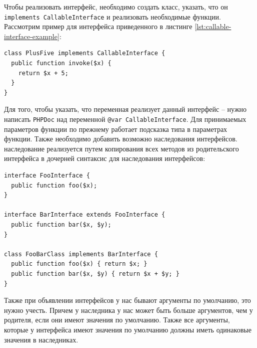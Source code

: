 Чтобы реализовать интерфейс, необходимо создать класс, указать, что он \verb|implements CallableInterface| и реализовать необходимые функции.
Рассмотрим пример для интерфейса приведенного в листинге \ref{lst:callable-interface-example}:
\begin{lstlisting}
class PlusFive implements CallableInterface {
  public function invoke($x) {
    return $x + 5;
  } 
}
\end{lstlisting}

Для того, чтобы указать, что переменная реализует данный интерфейс -- нужно написать \verb|PHPDoc| \cite{phpdoc} над переменной \verb|@var CallableInterface|.
Для принимаемых параметров функции по прежнему работает подсказка типа в параметрах функции.
Также необходимо добавить возможно наследования интерфейсов.
наследование реализуется путем копирования всех методов из родительского интерфейса в дочерней синтаксис для наследования интерфейсов:
\begin{lstlisting}
interface FooInterface {
  public function foo($x);
}

interface BarInterface extends FooInterface {
  public function bar($x, $y);
}

class FooBarClass implements BarInterface {
  public function foo($x) { return $x; }
  public function bar($x, $y) { return $x + $y; }
}
\end{lstlisting}

Также при объявлении интерфейсов у нас бывают аргументы по умолчанию, это нужно учесть.
Причем у наследника у нас может быть больше аргументов, чем у родителя, если они имеют значения по умолчанию.
Также все аргументы, которые у интерфейса имеют значения по умолчанию должны иметь одинаковые значения в наследниках.

